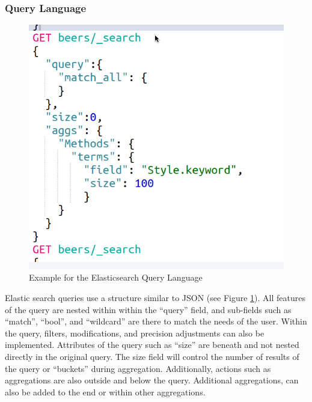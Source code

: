\documentclass[bibliography=totoc]{article}
\begin{document}
\subsubsection{Query Language}
\begin{figure}
   \includegraphics[height=0.7\textwidth]{beer_query_language.png}
   \caption{\label{beer_query_language}Example for the Elasticsearch Query Language} 
\end{figure}
Elastic search queries use a structure similar to JSON (see Figure \ref{beer_query_language}).
All features of the query are nested within within the “query” field, 
and sub-fields such as “match”, “bool”, and “wildcard” are 
there to match the needs of the user. 
Within the query, filters, modifications, and precision adjustments 
can also be implemented.
Attributes of the query such as “size” are beneath and not nested 
directly in the original query. The size field will control the 
number of results of the query or “buckets” during aggregation. 
Additionally, actions such as aggregations are also outside and below 
the query. Additional aggregations, can also be added to the end 
or within other aggregations.
\end{document}
